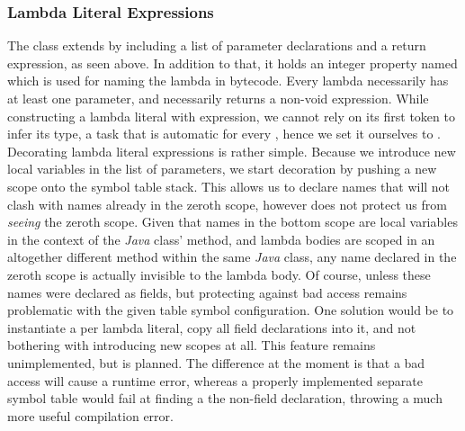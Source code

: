 \subsubsection{Lambda Literal Expressions}

The  class extends  by including a list of parameter declarations and a return expression, as seen above. In addition to that, it holds an integer property named  which is used for naming the lambda in bytecode. Every lambda necessarily has at least one parameter, and necessarily returns a non-void expression. While constructing a lambda literal with expression, we cannot rely on its first token to infer its type, a task that is automatic for every , hence we set it ourselves to . Decorating lambda literal expressions is rather simple. Because we introduce new local variables in the list of parameters, we start decoration by pushing a new scope onto the symbol table stack. This allows us to declare names that will not clash with names already in the zeroth scope, however does not protect us from \emph{seeing} the zeroth scope. Given that names in the bottom scope are local variables in the context of the \emph{Java} class'  method, and lambda bodies are scoped in an altogether different method within the same \emph{Java} class, any name declared in the zeroth scope is actually invisible to the lambda body. Of course, unless these names were declared as fields, but protecting against bad access remains problematic with the given table symbol configuration. One solution would be to instantiate a  per lambda literal, copy all field declarations into it, and not bothering with introducing new scopes at all. This feature remains unimplemented, but is planned. The difference at the moment is that a bad access will cause a runtime error, whereas a properly implemented separate symbol table would fail at finding a the non-field declaration, throwing a much more useful compilation error.

